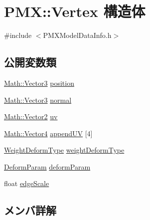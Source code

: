 \hypertarget{struct_p_m_x_1_1_vertex}{}\section{P\+MX\+:\+:Vertex 構造体}
\label{struct_p_m_x_1_1_vertex}


{\ttfamily \#include $<$P\+M\+X\+Model\+Data\+Info.\+h$>$}

\subsection*{公開変数類}
\begin{DoxyCompactItemize}
\item 
\mbox{\hyperlink{struct_math_1_1_vector3}{Math\+::\+Vector3}} \mbox{\hyperlink{struct_p_m_x_1_1_vertex_af5f5ae5450cc6505e4bdb682e5571dfa}{position}}
\item 
\mbox{\hyperlink{struct_math_1_1_vector3}{Math\+::\+Vector3}} \mbox{\hyperlink{struct_p_m_x_1_1_vertex_a3be1bb036d51feb79877facd2ebae142}{normal}}
\item 
\mbox{\hyperlink{struct_math_1_1_vector2}{Math\+::\+Vector2}} \mbox{\hyperlink{struct_p_m_x_1_1_vertex_a3de31d7167955c25cb574307108373b2}{uv}}
\item 
\mbox{\hyperlink{struct_math_1_1_vector4}{Math\+::\+Vector4}} \mbox{\hyperlink{struct_p_m_x_1_1_vertex_aa1853f33341e4c69511dc0cdcf31e229}{append\+UV}} \mbox{[}4\mbox{]}
\item 
\mbox{\hyperlink{namespace_p_m_x_a1a0e8dce30cb158a0c0d66cea0bf0f51}{Weight\+Deform\+Type}} \mbox{\hyperlink{struct_p_m_x_1_1_vertex_a0057bfb3e0ab2424a3f65b23f502fe11}{weight\+Deform\+Type}}
\item 
\mbox{\hyperlink{struct_p_m_x_1_1_deform_param}{Deform\+Param}} \mbox{\hyperlink{struct_p_m_x_1_1_vertex_a1bf88979fddbb76f12a170c42931e095}{deform\+Param}}
\item 
float \mbox{\hyperlink{struct_p_m_x_1_1_vertex_abba8577775a97e0d4334bd56114ebbb8}{edge\+Scale}}
\end{DoxyCompactItemize}


\subsection{メンバ詳解}
\mbox{\label{struct_p_m_x_1_1_vertex_aa1853f33341e4c69511dc0cdcf31e229}} 
